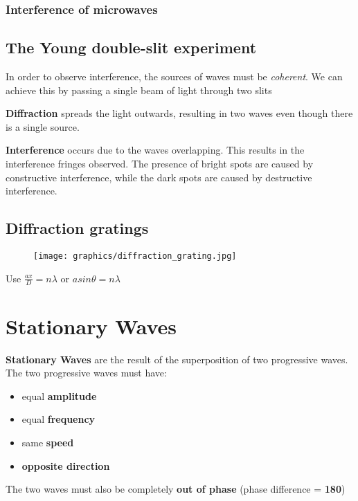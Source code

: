 \documentclass[12pt,a4paper]{article}
\begin{document}
\subsubsection{Interference of microwaves}

\subsection{The Young double-slit experiment}
In order to observe interference, the sources of waves must be \textit{coherent}. We can achieve this by passing a single beam of light through two slits

\bigskip \noindent
\textbf{Diffraction} spreads the light outwards, resulting in two waves even though there is a single source.

\bigskip \noindent
\textbf{Interference} occurs due to the waves overlapping. This results in the interference fringes observed. The presence of bright spots are caused by constructive interference, while the dark spots are caused by destructive interference.

\subsection{Diffraction gratings}

\begin{figure}[h]
\texttt{[image: graphics/diffraction\_grating.jpg]}
\centering
\end{figure}

\begin{center}
Use $\frac{ax}{D} = n\lambda$ or $asin\theta = n\lambda$
\end{center}

\newpage
\section{Stationary Waves}
\textbf{Stationary Waves} are the result of the superposition of two progressive waves. The two progressive waves must have: 
\begin{itemize}
    \item equal \textbf{amplitude}
    \item equal \textbf{frequency}
    \item same \textbf{speed}
    \item \textbf{opposite direction}
\end{itemize}
The two waves must also be completely \textbf{out of phase} (phase difference = \textbf{180}\textdegree)
\end{document}
